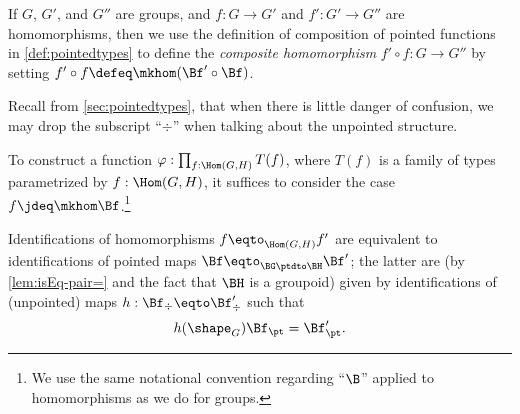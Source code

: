 \begin{definition}\label{def:group-homomorphism-composition}
  If $G$, $G'$, and $G''$ are groups, and $f : G\to G'$ and $f' : G'\to G''$ are homomorphisms, then we use
  the definition of composition of pointed functions in \cref{def:pointedtypes} to define the \emph{composite homomorphism}
  $f' \circ f : G \to G''$ by setting $f' \circ f \defeq \mkhom (\Bf' \circ \Bf)$.
\end{definition}

Recall from \cref{sec:pointedtypes},
that when there is little danger of confusion, we may drop the subscript
``$\div$'' when talking about the unpointed structure.

\begin{remark}\label{rem:Bf-convention}
  To construct a function $\varphi : \prod_{f:\Hom(G,H)}T(f)$,
  where $T(f)$ is a family of types parametrized by $f:\Hom(G,H)$,
  it suffices to consider the case $f \jdeq \mkhom\Bf$.\footnote{%
    We use the same notational convention regarding ``$\B$''
    applied to homomorphisms as we do for groups.}
\end{remark}

Identifications of homomorphisms $f\eqto_{\Hom(G,H)}f'$
are equivalent to identifications of pointed maps
$\Bf \eqto_{\BG\ptdto\BH} \Bf'$;
the latter are
(by \cref{lem:isEq-pair=} and the fact that $\BH$ is a groupoid)
given by identifications of (unpointed) maps
$h : \Bf_\div \eqto \Bf'_\div$ such that
\[
  h(\shape_G)\Bf_\pt = \Bf'_\pt.
\]


